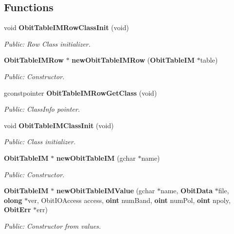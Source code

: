 \subsection*{Functions}
\begin{CompactItemize}
\item 
void {\bf Obit\-Table\-IMRow\-Class\-Init} (void)
\begin{CompactList}\small\item\em Public: Row Class initializer. \item\end{CompactList}\item 
{\bf Obit\-Table\-IMRow} $\ast$ {\bf new\-Obit\-Table\-IMRow} ({\bf Obit\-Table\-IM} $\ast$table)
\begin{CompactList}\small\item\em Public: Constructor. \item\end{CompactList}\item 
gconstpointer {\bf Obit\-Table\-IMRow\-Get\-Class} (void)
\begin{CompactList}\small\item\em Public: Class\-Info pointer. \item\end{CompactList}\item 
void {\bf Obit\-Table\-IMClass\-Init} (void)
\begin{CompactList}\small\item\em Public: Class initializer. \item\end{CompactList}\item 
{\bf Obit\-Table\-IM} $\ast$ {\bf new\-Obit\-Table\-IM} (gchar $\ast$name)
\begin{CompactList}\small\item\em Public: Constructor. \item\end{CompactList}\item 
{\bf Obit\-Table\-IM} $\ast$ {\bf new\-Obit\-Table\-IMValue} (gchar $\ast$name, {\bf Obit\-Data} $\ast$file, {\bf olong} $\ast$ver, Obit\-IOAccess access, {\bf oint} num\-Band, {\bf oint} num\-Pol, {\bf oint} npoly, {\bf Obit\-Err} $\ast$err)
\begin{CompactList}\small\item\em Public: Constructor from values. \item\end{CompactList}\item 

\end{CompactItemize}
